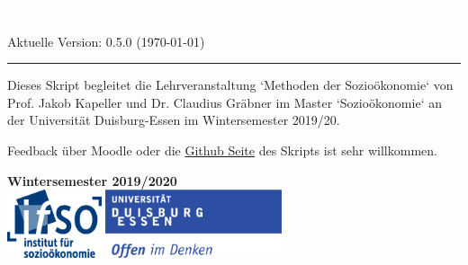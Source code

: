 \onehalfspacing
{}

\begin{titlepage}
\BgThispage
{}
\vspace*{2cm}
\noindent
\textcolor{white}{\bigsf R für die \mbox{sozioökonomische} Forschung}
\vspace*{1.0cm}\par
Aktuelle Version: 0.5.0 (\today)\\
\vspace*{2.0cm}\par
\noindent
\begin{minipage}{0.35\linewidth}
    \begin{flushright}
        \printauthor
    \end{flushright}
\end{minipage} \hspace{15pt}
%
\begin{minipage}{0.02\linewidth}
    \rule{1pt}{175pt}
\end{minipage} \hspace{-10pt}
%
\begin{minipage}{0.6\linewidth}
\vspace{5pt}
\begin{adjustwidth}{25pt}{25pt}
\raggedright
Dieses Skript begleitet die Lehrveranstaltung `Methoden der Sozioökonomie` von
Prof. Jakob Kapeller und Dr. Claudius Gräbner im Master `Sozioökonomie` an der
Universität Duisburg-Essen im Wintersemester 2019/20.

Feedback über Moodle oder die
\href{https://github.com/graebnerc/RforSocioEcon}{Github Seite} des Skripts ist
sehr willkommen.
\end{adjustwidth}

\end{minipage}

\vspace{0.25cm}
\centering
\vspace{1.25cm}
\textbf{Wintersemester 2019/2020}\\
\vfill
\includegraphics[height=2cm]{figures/ifso_logo_dt_RGB} \hspace{2cm}
\includegraphics[height=2cm]{figures/logo_ude.pdf}
\end{titlepage}

\newpage
{}
